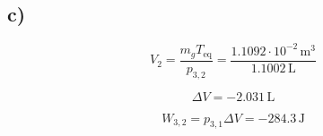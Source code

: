 

\subsection*{c)}
\[
V_{2} = \frac{m_{g} T_{\text{eq}}}{p_{3,2}} = \frac{1.1092 \cdot 10^{-2} \, \text{m}^3}{1.1002 \, \text{L}}
\]

\[
\Delta V = -2.031 \, \text{L}
\]

\[
W_{3,2} = p_{3,1} \Delta V = -284.3 \, \text{J}
\]